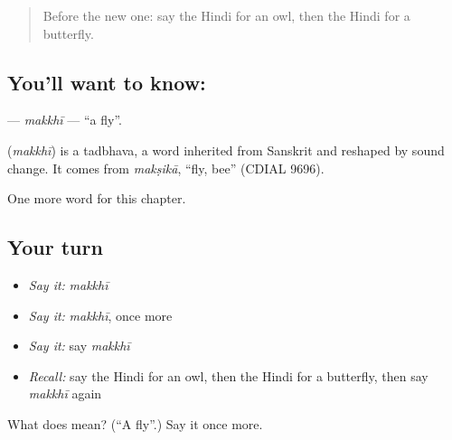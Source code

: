 \label{lesson:HI-C148-makkhi}



\begin{quote}
Before the new one: say the Hindi for an owl, then the Hindi for a butterfly.
\end{quote}

\subsection*{You'll want to know: }
\textbf{} — \emph{makkhī} — \textquotedblleft{}a fly\textquotedblright{}.

\begin{cousinweb}
\textbf{} (\emph{makkhī}) is a tadbhava, a word inherited from Sanskrit and reshaped by sound change. It comes from \emph{makṣikā}, \textquotedblleft{}fly, bee\textquotedblright{} (CDIAL 9696).
\end{cousinweb}

\begin{grammarlens}[title={What you've built}]
One more word for this chapter.
\end{grammarlens}

\subsection*{Your turn}
\begin{itemize}
\raggedright
  \item \emph{Say it:} \emph{makkhī}
  \item \emph{Say it:} \emph{makkhī}, once more
  \item \emph{Say it:} say \emph{makkhī}
  \item \emph{Recall:} say the Hindi for an owl, then the Hindi for a butterfly, then say \emph{makkhī} again
\end{itemize}

\begin{tcolorbox}[breakable,colback=teal!4,colframe=teal!35!black,title={Before you move on}]
What does  mean? (\textquotedblleft{}A fly\textquotedblright{}.) Say it once more.
\end{tcolorbox}
